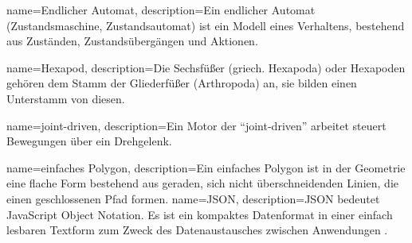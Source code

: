 %
%


%
%

%
%
{
  name={Endlicher Automat},
  description={Ein endlicher Automat (Zustandsmaschine, Zustandsautomat) ist ein Modell eines Verhaltens,
    bestehend aus Zuständen, Zustandsübergängen und Aktionen.}
}

{
  name={Hexapod},
  description={Die Sechsfüßer (griech. Hexapoda) oder Hexapoden
    gehören dem Stamm der Gliederfüßer (Arthropoda) an,
    sie bilden einen Unterstamm von diesen.}
}

{
  name={joint-driven},
  description={Ein Motor der ``joint-driven'' arbeitet steuert Bewegungen über ein Drehgelenk.
    }
}

{
  name={einfaches Polygon},
  description={Ein einfaches Polygon ist in der Geometrie eine flache Form bestehend aus geraden,
    sich nicht überschneidenden Linien, die einen geschlossenen Pfad formen.}
}
{
  name={JSON},
  description={JSON bedeutet JavaScript Object Notation.
  Es ist ein kompaktes Datenformat in einer einfach lesbaren Textform zum Zweck des Datenaustausches zwischen Anwendungen \cite{json}.
  }
}
